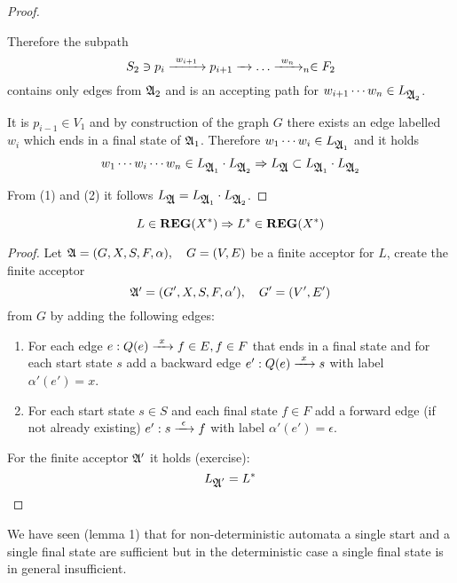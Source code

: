 \begin{proof}
\begin{enumerate}
  \missingfigure
  
  Therefore the subpath 
  \[ S_2 \ni p_i \xrightarrow{\ {w_{i+1}}\ } p_{i+1} \xrightarrow{\ {}\ } \ldots \xrightarrow{\ {w_n}\ } _n \in F_2 \]
  contains only edges from $\mbox{$\mathfrak{A}$}_2$ and is an accepting path for 
  $w_{i+1} \cdots w_n \in L_{\mbox{$\mathfrak{A}$}_2}$.
  
  It is $p_{i-1} \in V_1$ and by construction of the graph $G$ there exists
  an edge labelled $w_i$ which ends in a final state of $\mbox{$\mathfrak{A}$}_1$. Therefore
  $w_1 \cdots w_i \in L_{\mbox{$\mathfrak{A}$}_1}$ and it holds 
  \[ w_1 \cdots w_i \cdots w_n \in L_{\mbox{$\mathfrak{A}$}_1} \cdot L_{\mbox{$\mathfrak{A}$}_2} \Rightarrow
  L_{\mbox{$\mathfrak{A}$}} \subset L_{\mbox{$\mathfrak{A}$}_1} \cdot L_{\mbox{$\mathfrak{A}$}_2} \]
\end{enumerate}

From (1) and (2) it follows $L_{\mbox{$\mathfrak{A}$}} = L_{\mbox{$\mathfrak{A}$}_1} \cdot L_{\mbox{$\mathfrak{A}$}_2}$.
\end{proof}

\bigskip
\begin{theorem}
\[ L \in \mbox{{\bf REG}}(X^*) \Rightarrow L^* \in \mbox{{\bf REG}}(X^*) \]
\end{theorem}

\begin{proof}
Let $\mbox{$\mathfrak{A}$} = (G, X, S, F, \alpha),\quad G=(V,E)$	be a finite acceptor for $L$,
create the finite acceptor
\[ \mbox{$\mathfrak{A'}$} = (G', X, S, F, \alpha'),\quad G'=(V',E') \]
from $G$ by adding the following edges: 

\begin{enumerate}
  \item For each edge $e : Q(e) \xrightarrow{\ {x}\ } f \in E,f \in F$ that ends in a final 
  state and for each start state $s$ add a backward edge $e' : Q(e) \xrightarrow{\ {x}\ } s$ 
  with label $\alpha'(e') = x$.
  \item For each start state $s \in S$ and each final state $f \in F$ add a
  forward edge (if not already existing) $e' : s \xrightarrow{\ {\epsilon}\ } f$ with
  label $\alpha'(e') = \epsilon$.
\end{enumerate}

\begin{center}

\end{center}

For the finite acceptor $\mbox{$\mathfrak{A'}$}$ it holds (exercise): \[ L_{\mbox{$\mathfrak{A}$}'} = L^* \]
\end{proof}

We have seen (lemma 1) that for non-deterministic automata a single start and a
single final state are sufficient but in the deterministic case a single final
state is in general insufficient.


